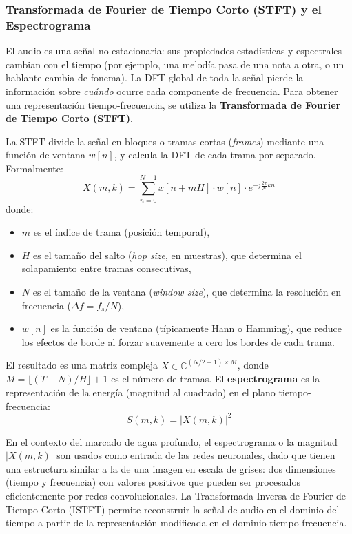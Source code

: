 \subsubsection{Transformada de Fourier de Tiempo Corto (STFT) y el Espectrograma}

El audio es una señal no estacionaria: sus propiedades estadísticas y espectrales cambian con el tiempo (por ejemplo, una melodía pasa de una nota a otra, o un hablante cambia de fonema). La DFT global de toda la señal pierde la información sobre \textit{cuándo} ocurre cada componente de frecuencia. Para obtener una representación tiempo-frecuencia, se utiliza la \textbf{Transformada de Fourier de Tiempo Corto (STFT)}.

La STFT divide la señal en bloques o tramas cortas (\textit{frames}) mediante una función de ventana $w[n]$, y calcula la DFT de cada trama por separado. Formalmente:
\begin{equation}
    X(m, k) = \sum_{n=0}^{N-1} x[n + mH] \cdot w[n] \cdot e^{-j\frac{2\pi}{N}kn}
\end{equation}
donde:
\begin{itemize}
    \item $m$ es el índice de trama (posición temporal),
    \item $H$ es el tamaño del salto (\textit{hop size}, en muestras), que determina el solapamiento entre tramas consecutivas,
    \item $N$ es el tamaño de la ventana (\textit{window size}), que determina la resolución en frecuencia ($\Delta f = f_s / N$),
    \item $w[n]$ es la función de ventana (típicamente Hann o Hamming), que reduce los efectos de borde al forzar suavemente a cero los bordes de cada trama.
\end{itemize}

El resultado es una matriz compleja $X \in \mathbb{C}^{(N/2+1) \times M}$, donde $M = \lfloor (T - N) / H \rfloor + 1$ es el número de tramas. El \textbf{espectrograma} es la representación de la energía (magnitud al cuadrado) en el plano tiempo-frecuencia:
\begin{equation}
    S(m, k) = |X(m, k)|^2
\end{equation}

En el contexto del marcado de agua profundo, el espectrograma o la magnitud $|X(m, k)|$ son usados como entrada de las redes neuronales, dado que tienen una estructura similar a la de una imagen en escala de grises: dos dimensiones (tiempo y frecuencia) con valores positivos que pueden ser procesados eficientemente por redes convolucionales. La Transformada Inversa de Fourier de Tiempo Corto (ISTFT) permite reconstruir la señal de audio en el dominio del tiempo a partir de la representación modificada en el dominio tiempo-frecuencia.


